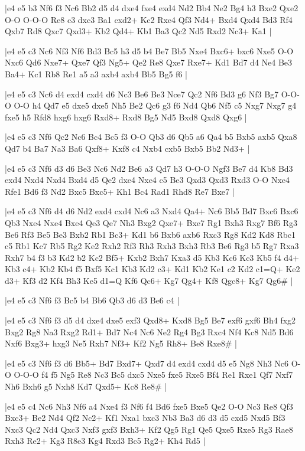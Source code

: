 \whitename{}
\blackname{}
\makegametitle
|e4 e5 b3 Nf6 f3 Nc6 Bb2 d5 d4 dxe4 fxe4 exd4 Nd2 Bb4 Ne2 Bg4 h3 Bxe2 Qxe2 O-O O-O-O Re8 c3 dxc3 Ba1 cxd2+ Kc2 Rxe4 Qf3 Nd4+ Bxd4 Qxd4 Bd3 Rf4 Qxb7 Rd8 Qxc7 Qxd3+ Kb2 Qd4+ Kb1 Ba3 Qc2 Nd5 Rxd2 Nc3+ Ka1  |

\whitename{}
\blackname{}
\makegametitle
|e4 e5 c3 Nc6 Nf3 Nf6 Bd3 Bc5 h3 d5 b4 Be7 Bb5 Nxe4 Bxc6+ bxc6 Nxe5 O-O Nxc6 Qd6 Nxe7+ Qxe7 Qf3 Ng5+ Qe2 Re8 Qxe7 Rxe7+ Kd1 Bd7 d4 Ne4 Be3 Ba4+ Kc1 Rb8 Re1 a5 a3 axb4 axb4 Bb5 Bg5 f6  |

\whitename{}
\blackname{}
\makegametitle
|e4 e5 c3 Nc6 d4 exd4 cxd4 d6 Nc3 Be6 Be3 Nce7 Qc2 Nf6 Bd3 g6 Nf3 Bg7 O-O-O O-O h4 Qd7 e5 dxe5 dxe5 Nh5 Be2 Qc6 g3 f6 Nd4 Qb6 Nf5 c5 Nxg7 Nxg7 g4 fxe5 h5 Rfd8 hxg6 hxg6 Rxd8+ Rxd8 Bg5 Nd5 Bxd8 Qxd8 Qxg6  |

\whitename{}
\blackname{}
\makegametitle
|e4 e5 c3 Nf6 Qc2 Nc6 Bc4 Bc5 f3 O-O Qb3 d6 Qb5 a6 Qa4 b5 Bxb5 axb5 Qxa8 Qd7 b4 Ba7 Na3 Ba6 Qxf8+ Kxf8 c4 Nxb4 cxb5 Bxb5 Bb2 Nd3+  |

\whitename{}
\blackname{}
\makegametitle
|e4 e5 c3 Nf6 d3 d6 Be3 Nc6 Nd2 Be6 a3 Qd7 h3 O-O-O Ngf3 Be7 d4 Kb8 Bd3 exd4 Nxd4 Nxd4 Bxd4 d5 Qe2 dxe4 Nxe4 c5 Be3 Qxd3 Qxd3 Rxd3 O-O Nxe4 Rfe1 Bd6 f3 Nd2 Bxc5 Bxc5+ Kh1 Bc4 Rad1 Rhd8 Re7 Bxe7  |

\whitename{}
\blackname{}
\makegametitle
|e4 e5 c3 Nf6 d4 d6 Nd2 exd4 cxd4 Nc6 a3 Nxd4 Qa4+ Nc6 Bb5 Bd7 Bxc6 Bxc6 Qb3 Nxe4 Nxe4 Bxe4 Qe3 Qe7 Nh3 Bxg2 Qxe7+ Bxe7 Rg1 Bxh3 Rxg7 Bf6 Rg3 Be6 Rf3 Be5 Be3 Bxb2 Rb1 Bc3+ Kd1 b6 Bxb6 axb6 Rxc3 Rg8 Kd2 Kd8 Rbc1 c5 Rb1 Kc7 Rb5 Rg2 Ke2 Rxh2 Rf3 Rh3 Rxh3 Bxh3 Rb3 Be6 Rg3 b5 Rg7 Rxa3 Rxh7 b4 f3 b3 Kd2 b2 Kc2 Bf5+ Kxb2 Bxh7 Kxa3 d5 Kb3 Kc6 Kc3 Kb5 f4 d4+ Kb3 c4+ Kb2 Kb4 f5 Bxf5 Kc1 Kb3 Kd2 c3+ Kd1 Kb2 Ke1 c2 Kd2 c1=Q+ Ke2 d3+ Kf3 d2 Kf4 Bh3 Ke5 d1=Q Kf6 Qc6+ Kg7 Qg4+ Kf8 Qgc8+ Kg7 Qg6\#  |

\whitename{}
\blackname{}
\makegametitle
|e4 e5 c3 Nf6 f3 Bc5 b4 Bb6 Qb3 d6 d3 Be6 c4  |

\whitename{}
\blackname{}
\makegametitle
|e4 e5 c3 Nf6 f3 d5 d4 dxe4 dxe5 exf3 Qxd8+ Kxd8 Bg5 Be7 exf6 gxf6 Bh4 fxg2 Bxg2 Rg8 Na3 Rxg2 Rd1+ Bd7 Nc4 Nc6 Ne2 Rg4 Bg3 Rxc4 Nf4 Kc8 Nd5 Bd6 Nxf6 Bxg3+ hxg3 Ne5 Rxh7 Nf3+ Kf2 Ng5 Rh8+ Be8 Rxe8\#  |

\whitename{}
\blackname{}
\makegametitle
|e4 e5 c3 Nf6 f3 d6 Bb5+ Bd7 Bxd7+ Qxd7 d4 exd4 cxd4 d5 e5 Ng8 Nh3 Nc6 O-O O-O-O f4 f5 Ng5 Re8 Nc3 Bc5 dxc5 Nxe5 fxe5 Rxe5 Bf4 Re1 Rxe1 Qf7 Nxf7 Nh6 Bxh6 g5 Nxh8 Kd7 Qxd5+ Kc8 Re8\#  |

\whitename{}
\blackname{}
\makegametitle
|e4 e5 c4 Nc6 Nh3 Nf6 a4 Nxe4 f3 Nf6 f4 Bd6 fxe5 Bxe5 Qe2 O-O Nc3 Re8 Qf3 Bxc3+ Be2 Nd4 Qf2 Nc2+ Kf1 Nxa1 bxc3 Nb3 Ba3 d6 d3 d5 cxd5 Nxd5 Bf3 Nxc3 Qc2 Nd4 Qxc3 Nxf3 gxf3 Bxh3+ Kf2 Qg5 Rg1 Qe5 Qxe5 Rxe5 Rg3 Rae8 Rxh3 Re2+ Kg3 R8e3 Kg4 Rxd3 Bc5 Rg2+ Kh4 Rd5  |

